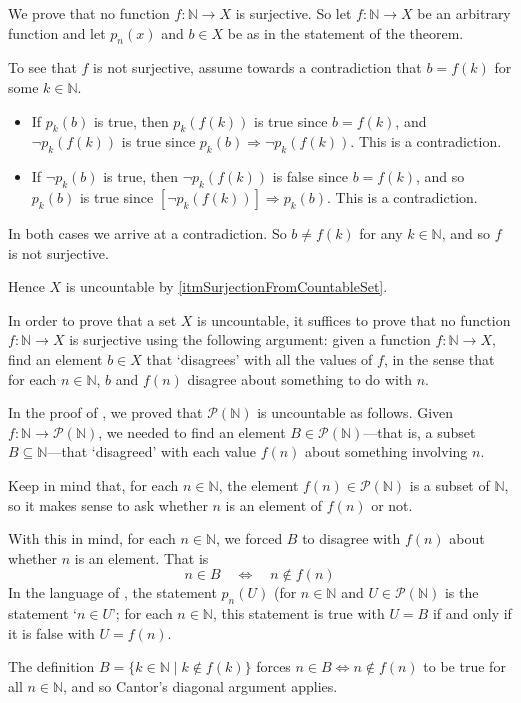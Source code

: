 \begin{cproof}
We prove that no function $f : \mathbb{N} \to X$ is surjective. So let $f : \mathbb{N} \to X$ be an arbitrary function and let $p_n(x)$ and $b \in X$ be as in the statement of the theorem.

To see that $f$ is not surjective, assume towards a contradiction that $b=f(k)$ for some $k \in \mathbb{N}$.
\begin{itemize}
\item If $p_k(b)$ is true, then $p_k(f(k))$ is true since $b=f(k)$, and $\neg p_k(f(k))$ is true since $p_k(b) \Rightarrow \neg p_k(f(k))$. This is a contradiction.
\item If $\neg p_k(b)$ is true, then $\neg p_k(f(k))$ is false since $b=f(k)$, and so $p_k(b)$ is true since $[\neg p_k(f(k))] \Rightarrow p_k(b)$. This is a contradiction. 
\end{itemize}
In both cases we arrive at a contradiction. So $b \ne f(k)$ for any $k \in \mathbb{N}$, and so $f$ is not surjective.

Hence $X$ is uncountable by \ref{itmSurjectionFromCountableSet}.
\end{cproof}

\begin{strategy}
\label{strCantorDiagonal}
In order to prove that a set $X$ is uncountable, it suffices to prove that no function $f : \mathbb{N} \to X$ is surjective using the following argument: given a function $f : \mathbb{N} \to X$, find an element $b \in X$ that `disagrees' with all the values of $f$, in the sense that for each $n \in \mathbb{N}$, $b$ and $f(n)$ disagree about something to do with $n$.
\end{strategy}

\begin{example}
In the proof of , we proved that $\mathcal{P}(\mathbb{N})$ is uncountable as follows. Given $f : \mathbb{N} \to \mathcal{P}(\mathbb{N})$, we needed to find an element $B \in \mathcal{P}(\mathbb{N})$---that is, a subset $B \subseteq \mathbb{N}$---that `disagreed' with each value $f(n)$ about something involving $n$.

Keep in mind that, for each $n \in \mathbb{N}$, the element $f(n) \in \mathcal{P}(\mathbb{N})$ is a subset of $\mathbb{N}$, so it makes sense to ask whether $n$ is an element of $f(n)$ or not.

With this in mind, for each $n \in \mathbb{N}$, we forced $B$ to disagree with $f(n)$ about whether $n$ is an element. That is
\[ n \in B \quad \Leftrightarrow \quad n \not\in f(n) \]
In the language of , the statement $p_n(U)$ (for $n \in \mathbb{N}$ and $U \in \mathcal{P}(\mathbb{N})$ is the statement `$n \in U$'; for each $n \in \mathbb{N}$, this statement is true with $U=B$ if and only if it is false with $U=f(n)$.

The definition $B = \{ k \in \mathbb{N} \mid k \not\in f(k) \}$ forces $n \in B \Leftrightarrow n \not\in f(n)$ to be true for all $n \in \mathbb{N}$, and so Cantor's diagonal argument applies.
\end{example}

